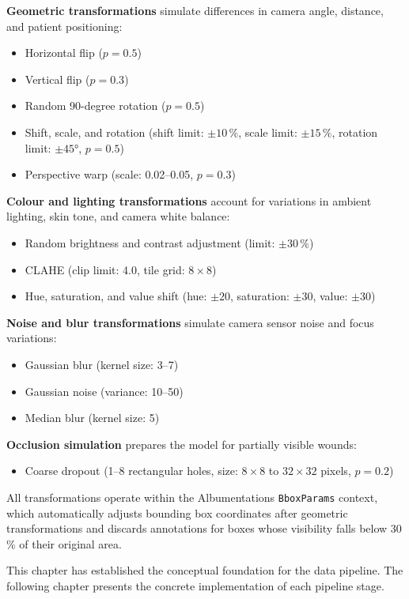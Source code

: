 \documentclass[a4paper,12pt,twoside]{report}
\begin{document}
\textbf{Geometric transformations} simulate differences in camera angle,
distance, and patient positioning:
\begin{itemize}
  \item Horizontal flip ($p = 0.5$)
  \item Vertical flip ($p = 0.3$)
  \item Random 90-degree rotation ($p = 0.5$)
  \item Shift, scale, and rotation (shift limit: $\pm 10\,\%$, scale limit:
    $\pm 15\,\%$, rotation limit: $\pm 45°$, $p = 0.5$)
  \item Perspective warp (scale: 0.02--0.05, $p = 0.3$)
\end{itemize}

\textbf{Colour and lighting transformations} account for variations in ambient
lighting, skin tone, and camera white balance:
\begin{itemize}
  \item Random brightness and contrast adjustment (limit: $\pm 30\,\%$)
  \item CLAHE (clip limit: 4.0, tile grid: $8 \times 8$)
  \item Hue, saturation, and value shift (hue: $\pm 20$, saturation: $\pm 30$,
    value: $\pm 30$)
\end{itemize}

\textbf{Noise and blur transformations} simulate camera sensor noise and focus
variations:
\begin{itemize}
  \item Gaussian blur (kernel size: 3--7)
  \item Gaussian noise (variance: 10--50)
  \item Median blur (kernel size: 5)
\end{itemize}

\textbf{Occlusion simulation} prepares the model for partially visible wounds:
\begin{itemize}
  \item Coarse dropout (1--8 rectangular holes, size: $8 \times 8$ to
    $32 \times 32$ pixels, $p = 0.2$)
\end{itemize}

All transformations operate within the Albumentations \texttt{BboxParams}
context, which automatically adjusts bounding box coordinates after geometric
transformations and discards annotations for boxes whose visibility falls below
30\,\% of their original area.

This chapter has established the conceptual foundation for the data pipeline.
The following chapter presents the concrete implementation of each pipeline
stage.
\end{document}
